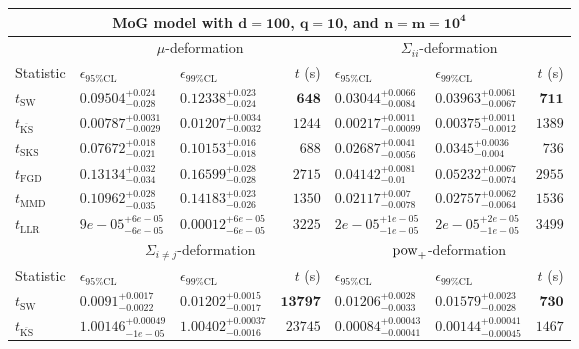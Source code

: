\begin{tabular}{l|llr|llr}
	\toprule
	\multicolumn{7}{c}{{\bf MoG model with $\mathbf{d=100}$, $\mathbf{q=10}$, and $\mathbf{n=m=10^{4}}$}} \\
	\toprule
	\multicolumn{1}{c}{} & \multicolumn{3}{c}{$\mu$-deformation} & \multicolumn{3}{c}{$\Sigma_{ii}$-deformation} \\
	Statistic & $\epsilon_{95\%\mathrm{CL}}$ & $\epsilon_{99\%\mathrm{CL}}$ & $t$ (s) & $\epsilon_{95\%\mathrm{CL}}$ & $\epsilon_{99\%\mathrm{CL}}$ & $t$ (s) \\
	\midrule
	$t_{\mathrm{SW}}$ & $0.09504_{-0.028}^{+0.024}$ & $0.12338_{-0.024}^{+0.023}$ & ${\mathbf{648}}$ & $0.03044_{-0.0084}^{+0.0066}$ & $0.03963_{-0.0067}^{+0.0061}$ & ${\mathbf{711}}$ \\
	$t_{\overline{\mathrm{KS}}}$ & ${\mathbf{0.00787_{-0.0029}^{+0.0031}}}$ & ${\mathbf{0.01207_{-0.0032}^{+0.0034}}}$ & $1244$ & ${\mathbf{0.00217_{-0.00099}^{+0.0011}}}$ & ${\mathbf{0.00375_{-0.0012}^{+0.0011}}}$ & $1389$ \\
	$t_{\mathrm{SKS}}$ & $0.07672_{-0.021}^{+0.018}$ & $0.10153_{-0.018}^{+0.016}$ & $688$ & $0.02687_{-0.0056}^{+0.0041}$ & $0.0345_{-0.004}^{+0.0036}$ & $736$ \\
	$t_{\mathrm{FGD}}$ & $0.13134_{-0.034}^{+0.032}$ & $0.16599_{-0.028}^{+0.028}$ & $2715$ & $0.04142_{-0.01}^{+0.0081}$ & $0.05232_{-0.0074}^{+0.0067}$ & $2955$ \\
	$t_{\mathrm{MMD}}$ & $0.10962_{-0.035}^{+0.028}$ & $0.14183_{-0.026}^{+0.023}$ & $1350$ & $0.02117_{-0.0078}^{+0.007}$ & $0.02757_{-0.0064}^{+0.0062}$ & $1536$ \\
	$t_{\mathrm{LLR}}$ & $9e-05_{-6e-05}^{+6e-05}$ & $0.00012_{-6e-05}^{+6e-05}$ & $3225$ & $2e-05_{-1e-05}^{+1e-05}$ & $2e-05_{-1e-05}^{+2e-05}$ & $3499$ \\
	\toprule
	\multicolumn{1}{c}{} & \multicolumn{3}{c}{$\Sigma_{i\neq j}$-deformation} & \multicolumn{3}{c}{$\rm{pow}_{+}$-deformation} \\
	Statistic & $\epsilon_{95\%\mathrm{CL}}$ & $\epsilon_{99\%\mathrm{CL}}$ & $t$ (s) & $\epsilon_{95\%\mathrm{CL}}$ & $\epsilon_{99\%\mathrm{CL}}$ & $t$ (s) \\
	\midrule
	$t_{\mathrm{SW}}$ & $0.0091_{-0.0022}^{+0.0017}$ & $0.01202_{-0.0017}^{+0.0015}$ & ${\mathbf{13797}}$ & $0.01206_{-0.0033}^{+0.0028}$ & $0.01579_{-0.0028}^{+0.0023}$ & ${\mathbf{730}}$ \\
	$t_{\overline{\mathrm{KS}}}$ & $1.00146_{-1e-05}^{+0.00049}$ & $1.00402_{-0.0016}^{+0.00037}$ & $23745$ & ${\mathbf{0.00084_{-0.00041}^{+0.00043}}}$ & ${\mathbf{0.00144_{-0.00045}^{+0.00041}}}$ & $1467$ \\

\end{tabular}
